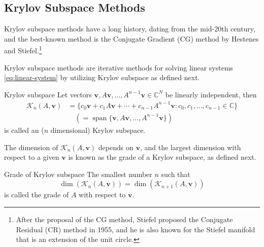 \subsection{Krylov Subspace Methods}\label{sec:krylov-subspace-methods}

Krylov subspace methods have a long history, dating from the mid-20th century, and the best-known method is the Conjugate Gradient (CG) method by Hestenes and Stiefel.\footnote{After the proposal of the CG method, Stiefel proposed the Conjugate Residual (CR) method in 1955, and he is also known for the Stiefel manifold that is an extension of the unit circle.}

Krylov subspace methods are iterative methods for solving linear systems \eqref{eq:linear-system} by utilizing Krylov subspace as defined next.

\begin{Definition}{Krylov subspace}\label{def:krylov-subspace}
Let vectors $\bm v,A\bm v,\ldots,A^{n-1}\bm v\in\mathbb C^N$ be linearly independent, then
\begin{equation}\label{eq:krylov-subspace-span}
\begin{aligned}
\mathcal K_n(A,\bm v)&=\{c_0\bm v+c_1A\bm v+\cdots+c_{n-1}A^{n-1}\bm v:c_0,c_1,\ldots,c_{n-1}\in\mathbb C\}\\
&\quad(=\operatorname{span}\{\bm v,A\bm v,\ldots,A^{n-1}\bm v\})
\end{aligned}
\end{equation}
is called an ($n$ dimensional) Krylov subspace.
\end{Definition}

The dimension of $\mathcal K_n(A,\bm v)$ depends on $\bm v$, and the largest dimension with respect to a given $\bm v$ is known as the grade of a Krylov subspace, as defined next.

\begin{Definition}{Grade of Krylov subspace}\label{def:krylov-grade}
The smallest number $n$ such that
\begin{equation}\label{eq:krylov-grade-stabilization}
\dim(\mathcal K_n(A,\bm v))=\dim(\mathcal K_{n+1}(A,\bm v))
\end{equation}
is called the grade of $A$ with respect to $\bm v$.
\end{Definition}

